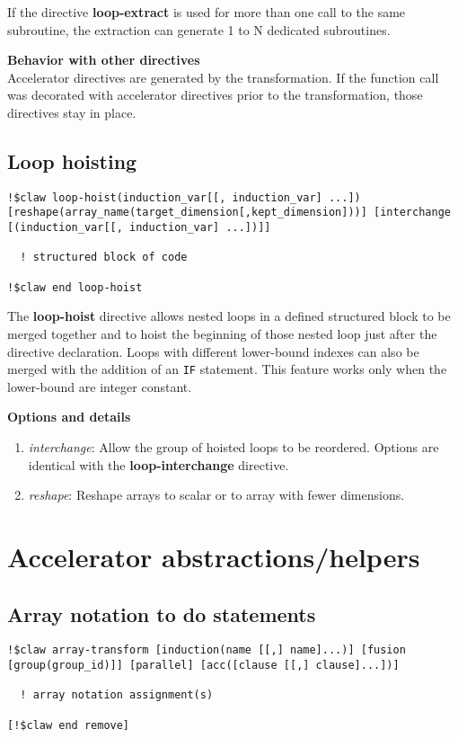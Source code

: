 \documentclass{article}
\begin{document}
If the directive \textbf{loop-extract} is used for more than one call to the same
subroutine, the extraction can generate 1 to N dedicated subroutines.

\textbf{Behavior with other directives}\\
Accelerator directives are generated by the transformation. If the function call was decorated 
with accelerator directives prior to the transformation, those directives stay in place. 

\subsection{Loop hoisting}
\begin{lstlisting}
!$claw loop-hoist(induction_var[[, induction_var] ...]) [reshape(array_name(target_dimension[,kept_dimension]))] [interchange [(induction_var[[, induction_var] ...])]]

  ! structured block of code
  
!$claw end loop-hoist
\end{lstlisting}

The \textbf{loop-hoist} directive allows nested loops in a defined structured block to
be merged together and to hoist the beginning of those nested loop just after
the directive declaration. Loops with different lower-bound indexes
can also be merged with the addition of an \lstinline!IF! statement. This feature works 
only when the lower-bound are integer constant. 


\textbf{Options and details}
\begin{enumerate}
\item \textit{interchange}: Allow the group of hoisted loops to be reordered.
Options are identical with the \textbf{loop-interchange} directive.
\item \textit{reshape}: Reshape arrays to scalar or to array with fewer dimensions. 
\end{enumerate}


\section{Accelerator abstractions/helpers}

\subsection{Array notation to do statements}

\begin{lstlisting}
!$claw array-transform [induction(name [[,] name]...)] [fusion [group(group_id)]] [parallel] [acc([clause [[,] clause]...])]

  ! array notation assignment(s) 
  
[!$claw end remove]
\end{lstlisting}
\end{document}
